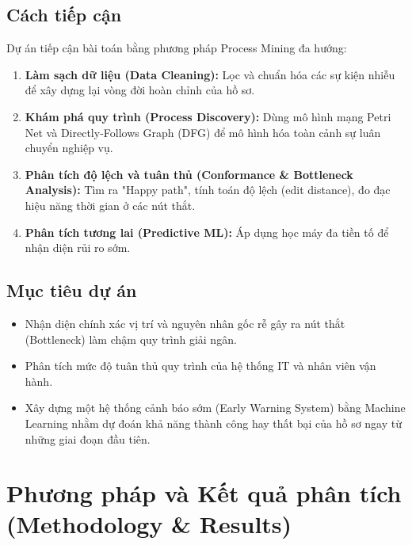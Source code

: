 \documentclass[a4paper,12pt]{article}
\begin{document}
\subsection{Cách tiếp cận}
Dự án tiếp cận bài toán bằng phương pháp Process Mining đa hướng:
\begin{enumerate}
    \item \textbf{Làm sạch dữ liệu (Data Cleaning):} Lọc và chuẩn hóa các sự kiện nhiễu để xây dựng lại vòng đời hoàn chỉnh của hồ sơ.
    \item \textbf{Khám phá quy trình (Process Discovery):} Dùng mô hình mạng Petri Net và Directly-Follows Graph (DFG) để mô hình hóa toàn cảnh sự luân chuyển nghiệp vụ.
    \item \textbf{Phân tích độ lệch và tuân thủ (Conformance \& Bottleneck Analysis):} Tìm ra "Happy path", tính toán độ lệch (edit distance), đo đạc hiệu năng thời gian ở các nút thắt.
    \item \textbf{Phân tích tương lai (Predictive ML):} Áp dụng học máy đa tiền tố để nhận diện rủi ro sớm.
\end{enumerate}

\subsection{Mục tiêu dự án}
\begin{itemize}
    \item Nhận diện chính xác vị trí và nguyên nhân gốc rễ gây ra nút thắt (Bottleneck) làm chậm quy trình giải ngân.
    \item Phân tích mức độ tuân thủ quy trình của hệ thống IT và nhân viên vận hành.
    \item Xây dựng một hệ thống cảnh báo sớm (Early Warning System) bằng Machine Learning nhằm dự đoán khả năng thành công hay thất bại của hồ sơ ngay từ những giai đoạn đầu tiên.
\end{itemize}

\section{Phương pháp và Kết quả phân tích (Methodology \& Results)}
\end{document}
